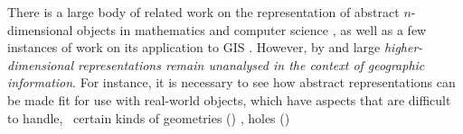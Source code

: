 
There is a large body of related work on the representation of abstract $n$-dimensional objects in mathematics and computer science \citep{Brisson93,Lienhardt94}, as well as a few instances of work on its application to GIS \citep{Karimipour10}.
However, by and large \emph{higher-dimensional representations remain unanalysed in the context of geographic information}.
For instance, it is necessary to see how abstract representations can be made fit for use with real-world objects, which have aspects that are difficult to handle, \eg\ certain kinds of geometries ()
, holes ()
